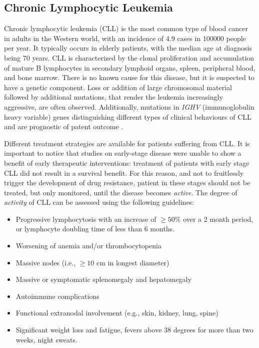 \subsection{Chronic Lymphocytic Leukemia}
Chronic lymphocytic leukemia (CLL) is the most common type of blood cancer in adults in the Western world, with an incidence of 4.9 cases in 100000 people per year. It typically occurs in elderly patients, with the median age at diagnosis being 70 years. CLL is characterized by the clonal proliferation and accumulation of mature B lymphocytes in secondary lymphoid organs, spleen, peripheral blood, and bone marrow. \cite{cll-burger-med, cll-rozman-med}  There is no known cause for this disease, but it is suspected to have a genetic component. Loss or addition of large chromosomal material followed by additional mutations, that render the leukemia increasingly aggressive, are often observed. Additionally, mutations in \textit{IGHV} (immunoglobulin heavy variable) genes distinguishing different types of clinical behaviours of CLL and are prognostic of patent outcome \cite{immunogl-med}. \par
\vspace{0.4cm}
Different treatment strategies are available for patients suffering from CLL. It is important to notice that studies on early-stage disease were unable to show a benefit of early therapeutic interventions: treatment of patients with early stage CLL did not result in a survival benefit. For this reason, and not to fruitlessly trigger the development of drug resistance, patient in these stages should not be treated, but only monitored, until the disease becomes \textit{active}. The degree of \textit{activity} of CLL can be assessed using the following guidelines:
\begin{itemize}
    \item Progressive lymphocytosis with an increase of $\geq 50 \%$ over a 2 month period, or lymphocyte doubling time of less than 6 months.
    \item Worsening of anemia and/or thrombocytopenia
    \item Massive nodes (i.e., $\geq 10$ cm in longest diameter)
    \item Massive or symptomatic splenomegaly and hepatomegaly
    \item Autoimmune complications
    \item Functional extranodal involvement (e.g., skin, kidney, lung, spine)
    \item Significant weight loss and fatigue, fevers above 38 degrees for more than two weeks, night sweats. 
\end{itemize}
